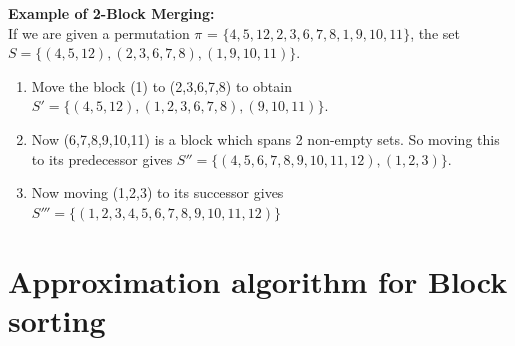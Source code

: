 \documentclass[BTech]{iitmdiss}
\begin{document}
\textbf{Example of 2-Block Merging:}\\
If we are given a permutation $\pi$ = $\{4,5,12,2,3,6,7,8,1,9,10,11\}$, the set $S = \{(4,5,12),(2,3,6,7,8),(1,9,10,11)\}.$
\begin{enumerate}
    \item Move the block (1) to (2,3,6,7,8) to obtain $S' = \{(4,5,12),(1,2,3,6,7,8),(9,10,11)\}.$ 
    \item Now (6,7,8,9,10,11) is a block which spans 2 non-empty sets. So moving this to its predecessor gives $S'' = \{(4,5,6,7,8,9,10,11,12),(1,2,3)\}.$ 
    \item Now moving (1,2,3) to its successor gives $S''' = \{(1,2,3,4,5,6,7,8,9,10,11,12)\}$
\end{enumerate}

\chapter{Approximation algorithm for Block sorting}
\end{document}
